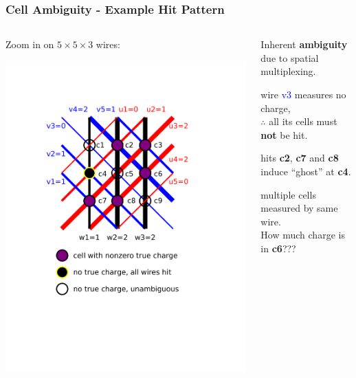\begin{frame}
  \frametitle{Cell Ambiguity - Example Hit Pattern}

  \begin{columns}
    \begin{column}{0.35\textwidth}
      \begin{center}
        \scriptsize Zoom in on $5 \times 5 \times 3$ wires:

        \includegraphics[width=\textwidth,trim=3.5cm 6cm 5cm 3cm,clip]{example-hit-cells.pdf}        

      \end{center}
    \end{column}
    \begin{column}{0.65\textwidth}

      Inherent \textbf{ambiguity} due to spatial multiplexing.

      \vspace{5mm}

      \begin{description}\scriptsize
      \item[Good] wire \textcolor{blue}{v3} measures no charge, \\$\therefore$ all its cells must \textbf{not} be hit.
      \item[Bad] hits \textbf{c2}, \textbf{c7} and \textbf{c8} induce ``ghost'' at \textbf{c4}.
      \item[Ambiguous] multiple cells measured by same wire.\\
        How much charge is in \textbf{c6}???
      \end{description}


\end{column}
\end{columns}
\end{frame}

